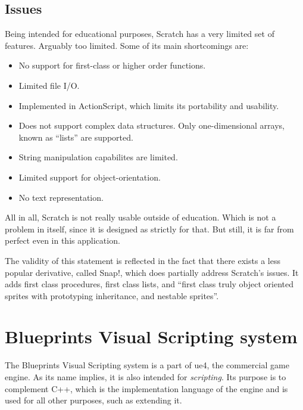 \subsection{Issues}
Being intended for educational purposes, Scratch has a very limited set of features. Arguably too limited. Some of its main shortcomings are:
\begin{itemize}
    \item No support for first-class or higher order functions.
    \item Limited file I/O.
    \item Implemented in ActionScript, which limits its portability and usability.
    \item Does not support complex data structures. Only one-dimensional arrays, known as ``lists'' are supported.
    \item String manipulation capabilites are limited.
    \item Limited support for object-orientation.
    \item No text representation.
\end{itemize}

All in all, Scratch is not really usable outside of education. Which is not a problem in itself, since it is designed as strictly for that. But still, it is far from perfect even in this application.

The validity of this statement is reflected in the fact that there exists a less popular derivative, called Snap!, which does partially address Scratch's issues. It adds first class procedures, first class lists, and ``first class truly object oriented sprites with prototyping inheritance, and nestable sprites''\cite[Section~Features and derivatives]{scratch_wikipedia}.

\section{Blueprints Visual Scripting system}
The Blueprints Visual Scripting system is a part of \acrlong{ue4}, the commercial game engine. As its name implies, it is also intended for \textit{scripting}. Its purpose is to complement C++, which is the implementation language of the engine and is used for all other purposes, such as extending it.


